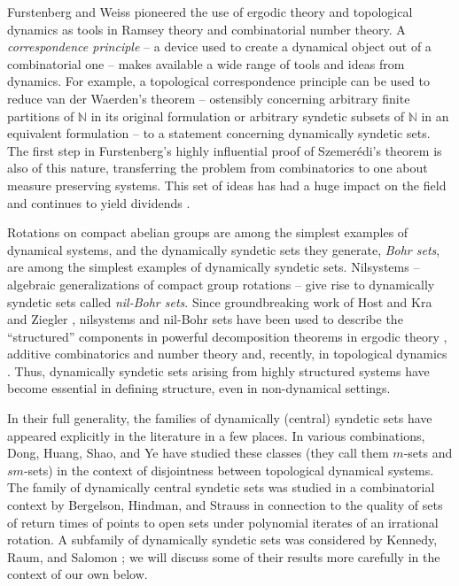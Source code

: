 \documentclass[letter,11pt]{article}
\theoremstyle{plain}
\theoremstyle{definition}
\theoremstyle{plain}
\theoremstyle{plain}
\numberwithin{equation}{section}
\newcommand{\Szemeredi}{Szemer\'{e}di}
\newcommand{\N}{\mathbb{N}}
\begin{document}
Furstenberg and Weiss \cite{Furstenberg-ErgodicBehavior, Furstenberg_Weiss-topological-dynamics} pioneered the use of ergodic theory and topological dynamics as tools in Ramsey theory and combinatorial number theory.  A \emph{correspondence principle} -- a device used to create a dynamical object out of a combinatorial one -- makes available a wide range of tools and ideas from dynamics.
For example, a topological correspondence principle can be used to reduce van der Waerden's theorem -- ostensibly concerning arbitrary finite partitions of $\N$ in its original formulation \cite{van_der_waerden_1927} or arbitrary syndetic subsets of $\N$ in an equivalent formulation \cite{kakeya_morimoto_1930} -- to a statement concerning dynamically syndetic sets.
The first step in Furstenberg's highly influential proof of \Szemeredi{}'s theorem \cite{Furstenberg-ErgodicBehavior} is also of this nature, transferring the problem from combinatorics to one about measure preserving systems.  This set of ideas has had a huge impact on the field and continues to yield dividends \cite{ward_ergodic_theory_interactions_survey}.


Rotations on compact abelian groups are among the simplest examples of dynamical systems, and the dynamically syndetic sets they generate, \emph{Bohr sets}, are  among the simplest examples of dynamically syndetic sets.  Nilsystems -- algebraic generalizations of compact group rotations -- give rise to dynamically syndetic sets called \emph{nil-Bohr sets}.
Since groundbreaking work of Host and Kra \cite{host_kra_2005} and Ziegler \cite{ziegler_2007}, nilsystems and nil-Bohr sets have been used to describe the ``structured'' components in powerful decomposition theorems in ergodic theory \cite{Bergelson_Host_Kra05, frant15, leibman_2010}, additive combinatorics and number theory \cite{Green_Tao10, Green_Tao12, Green_Tao12a, Green_Tao_Ziegler12} and, recently, in topological dynamics \cite{glasner_huang_shao_weiss_ye_2020}.
Thus, dynamically syndetic sets arising from highly structured systems have become essential in defining structure, even in non-dynamical settings.


In their full generality, the families of dynamically (central) syndetic sets have appeared explicitly in the literature in a few places.  In various combinations, Dong, Huang, Shao, and Ye \cite{dong_shao_ye_2012,Huang_Shao_Ye_2019,huang_ye_2005} have studied these classes (they call them $m$-sets  and $sm$-sets) in the context of disjointness between topological dynamical systems.  The family of dynamically central syndetic sets was studied in a combinatorial context by Bergelson, Hindman, and Strauss \cite{bergelson_hindman_strauss_2012} in connection to the quality of sets of return times of points to open sets under polynomial iterates of an irrational rotation.  A subfamily of dynamically syndetic sets was considered by Kennedy, Raum, and Salomon \cite{kennedy_raum_salomon_2022}; we will discuss some of their results more carefully in the context of our own below.
\end{document}
